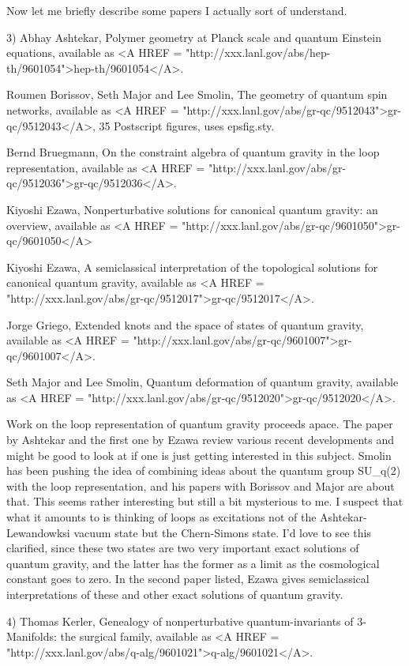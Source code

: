 Now let me briefly describe some papers I actually sort of understand.

3) Abhay Ashtekar, Polymer geometry at Planck scale and quantum Einstein
equations, available as <A HREF = "http://xxx.lanl.gov/abs/hep-th/9601054">hep-th/9601054</A>.

Roumen Borissov, Seth Major and Lee Smolin, The geometry of quantum spin
networks, available as <A HREF = "http://xxx.lanl.gov/abs/gr-qc/9512043">gr-qc/9512043</A>, 35 Postscript figures,
uses epsfig.sty.  

Bernd Bruegmann, On the constraint algebra of quantum gravity in the
loop representation, available as <A HREF = "http://xxx.lanl.gov/abs/gr-qc/9512036">gr-qc/9512036</A>.  

Kiyoshi Ezawa, Nonperturbative solutions for canonical quantum gravity:
an overview, available as <A HREF = "http://xxx.lanl.gov/abs/gr-qc/9601050">gr-qc/9601050</A>

Kiyoshi Ezawa, A semiclassical interpretation of the topological solutions for
canonical quantum gravity, available as <A HREF = "http://xxx.lanl.gov/abs/gr-qc/9512017">gr-qc/9512017</A>.  

Jorge Griego, Extended knots and the space of states of quantum gravity,
available as <A HREF = "http://xxx.lanl.gov/abs/gr-qc/9601007">gr-qc/9601007</A>.  

Seth Major and Lee Smolin, Quantum deformation of quantum gravity,
available as <A HREF = "http://xxx.lanl.gov/abs/gr-qc/9512020">gr-qc/9512020</A>.


Work on the loop representation of quantum gravity proceeds apace.  
The paper by Ashtekar and the first one by Ezawa review various recent
developments and might be good to look at if one is just getting
interested in this subject.  Smolin has been pushing the idea of
combining ideas about the quantum group SU_q(2) with the loop
representation, and his papers with Borissov and Major are about that.
This seems rather interesting but still a bit mysterious to me.  I
suspect that what it amounts to is thinking of loops as excitations not
of the Ashtekar-Lewandowksi vacuum state but the Chern-Simons state.
I'd love to see this clarified, since these two states are two very
important exact solutions of quantum gravity, and the latter has the
former as a limit as the cosmological constant goes to zero.  In the
second paper listed, Ezawa gives semiclassical interpretations of these
and other exact solutions of quantum gravity. 

4) Thomas Kerler, Genealogy of nonperturbative quantum-invariants of
3-Manifolds: the surgical family, available as <A HREF = "http://xxx.lanl.gov/abs/q-alg/9601021">q-alg/9601021</A>.


